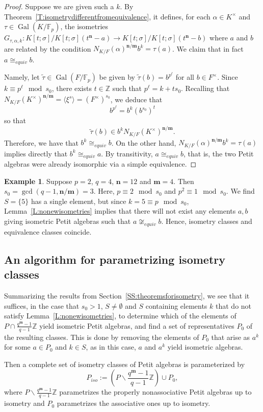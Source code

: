 \documentclass[11pt]{amsart}
\theoremstyle{plain}
\theoremstyle{definition}
\newtheorem{example}[theorem]{Example}
\numberwithin{equation}{section}
\numberwithin{figure}{section}
\newcommand{\ZZ}{\mathbb{Z}}
\newcommand{\FF}{\mathbb{F}}
\newcommand{\Kone}[1]{K[t;\sigma]/K[t;\sigma](t^{\de}-#1)}
\newcommand{\os}{{\mathbf{m}}}  %
\newcommand{\de}{{\mathbf{n}}}  %
\DeclareMathOperator{\Gal}{Gal}
\begin{document}
\begin{proof}
    Suppose we are given such a $k$.  By Theorem~\ref{T:isometrydifferentfromequivalence}, it defines, for each $\alpha \in K^\times$ and $\tau\in \Gal(K/\FF_p)$, the  isometries $G_{\tau,\alpha,k}:\Kone{a}\to \Kone{b}$ where $a$ and $b$ are related by the condition $N_{K/F}(\alpha)^{\de/\os}b^k=\tau(a)$.
    We claim that in fact $a\cong_{equiv}b$.

    Namely, let $\tilde{\tau}\in \Gal(F/\FF_p)$ be given by $\tilde{\tau}(b)=b^{p^\ell}$ for all $b\in F^\times$.  Since $k\equiv p^\ell \mod s_0$, there exists $t\in \ZZ$ such that $p^\ell=k + ts_0$. Recalling that $N_{K/F}(K^\times)^{\de/\os}=\langle \xi^s\rangle = (F^\times)^{s_0}$, we deduce that
    $$b^{p^\ell}=b^k  (b^{s_0})^t$$
    so that $$
    \tilde{\tau}(b)\in b^kN_{K/F}(K^\times)^{\de/\os}.$$
    Therefore, we have that $b^k\cong_{equiv} b$.  On the other hand, $N_{K/F}(\alpha)^{\de/\os}b^k=\tau(a)$ implies directly that $b^k \cong_{equiv} a$.  By transitivity, $a\cong_{equiv}b$, that is, the two Petit algebras were already isomorphic via a simple equivalence.
\end{proof}

\begin{example}
    Suppose $p=2$, $q=4$, $\de=12$ and $\os=4$.  Then $s_0=\gcd(q-1,\de/\os)=3$.  Here, $p\equiv 2\mod s_0$ and $p^2\equiv 1\mod s_0$.  We find $S=\{5\}$ has a single element, but since $k=5\equiv p\mod s_0$, Lemma~\ref{L:nonewisometries} implies that there will not exist any elements $a,b$ giving isometric Petit algebras such that $a\not\cong_{equiv}b$.  Hence, isometry classes and equivalence classes coincide.
\end{example}

\subsection{An algorithm for parametrizing isometry classes}
Summarizing the results from Section~\ref{SS:theoremsforisometry}, we see that it suffices, in the case that $s_0>1$, $S\neq \emptyset$ and $S$ containing elements $k$ that do not satisfy Lemma~\ref{L:nonewisometries}, to determine which of the elements of $P \cap \frac{q^\os-1}{q-1}\ZZ$ yield isometric Petit algebras, and find a set of representatives $P_0$ of the resulting classes.  This is done by removing the elements of $P_0$ that arise as $a^k$ for some $a\in P_0$ and $k\in S$, as in this case, $a$ and $a^k$ yield isometric algebras.

Then a complete set of isometry classes of Petit algebras is parameterized by
\begin{equation}\label{E:replaceP_0}
P_{iso}:=(P \smallsetminus \frac{q^\os-1}{q-1}\ZZ) \cup P_0,
\end{equation}
where $P \smallsetminus \frac{q^\os-1}{q-1}\ZZ$ parametrizes the properly nonassociative Petit algebras up to isometry and $P_0$ parametrizes the associative ones up to isometry.
\end{document}
